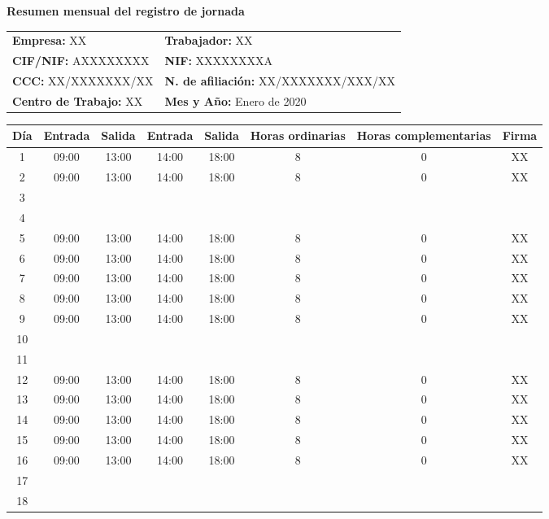 \documentclass[a4paper, 11pt]{article}
\begin{document}
{\Large \bf Resumen mensual del registro de jornada\\}

\begin{tabular*}{.9\textwidth}{| l @{\extracolsep{\fill}} l |}
    \hline
    {\bf Empresa:} XX & {\bf Trabajador:} XX \\
    {\bf CIF/NIF:} AXXXXXXXX & {\bf NIF:} XXXXXXXXA \\
    {\bf CCC:} XX/XXXXXXX/XX & {\bf N. de afiliación:} XX/XXXXXXX/XXX/XX \\
    {\bf Centro de Trabajo:} XX & {\bf Mes y Año:} Enero de 2020  \\
    \hline
  \end{tabular*}

\vskip 0.4cm

\begin{tabular}{| c | c | c | c | c | c | c | c |}
  \hline 
  {\bf Día} & {\bf Entrada} & {\bf Salida} & {\bf Entrada} & {\bf Salida} & {\bf Horas ordinarias} &
  {\bf Horas complementarias} & {\bf Firma} \\[1ex]
  \hline
  1 & 09:00 & 13:00 & 14:00 & 18:00 & 8 & 0 & XX \\
  2 & 09:00 & 13:00 & 14:00 & 18:00 & 8 & 0 & XX \\
  3 & & & & & & & \\
  4 & & & & & & & \\
  5 & 09:00 & 13:00 & 14:00 & 18:00 & 8 & 0 & XX \\
  6 & 09:00 & 13:00 & 14:00 & 18:00 & 8 & 0 & XX \\
  7 & 09:00 & 13:00 & 14:00 & 18:00 & 8 & 0 & XX \\
  8 & 09:00 & 13:00 & 14:00 & 18:00 & 8 & 0 & XX \\
  9 & 09:00 & 13:00 & 14:00 & 18:00 & 8 & 0 & XX \\
  10 & & & & & & & \\
  11 & & & & & & & \\
  12 & 09:00 & 13:00 & 14:00 & 18:00 & 8 & 0 & XX \\
  13 & 09:00 & 13:00 & 14:00 & 18:00 & 8 & 0 & XX \\
  14 & 09:00 & 13:00 & 14:00 & 18:00 & 8 & 0 & XX \\
  15 & 09:00 & 13:00 & 14:00 & 18:00 & 8 & 0 & XX \\
  16 & 09:00 & 13:00 & 14:00 & 18:00 & 8 & 0 & XX \\
  17 & & & & & & & \\
  18 & & & & & & & \\

\end{tabular}
\end{document}
